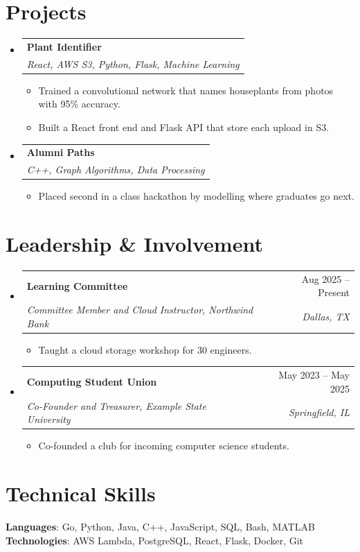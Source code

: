 \documentclass[letterpaper,11pt]{article}
\makeatletter
\newcommand{\entry}[4]{
  \item
  \begin{tabular*}{0.97\textwidth}[t]{l@{\extracolsep{\fill}}r}
    \textbf{#1} & #2 \\
    \textit{\small#3} & \textit{\small #4} \\
  \end{tabular*}\vspace{-7pt}
}
\newcommand{\project}[2]{
  \item
  \begin{tabular*}{0.97\textwidth}[t]{l}
    \textbf{#1} \\
    \textit{\small#2} \\
  \end{tabular*}\vspace{-7pt}
}
\newenvironment{entries}{\begin{itemize}[leftmargin=0.15in, label={}]}{\end{itemize}}
\newenvironment{points}{\begin{itemize}[leftmargin=0.2in]}{\end{itemize}\vspace{-5pt}}
\makeatother
\begin{document}
\section{Projects}
\begin{entries}
  \project{Plant Identifier}{React, AWS S3, Python, Flask, Machine Learning}
  \begin{points}
    \item Trained a convolutional network that names houseplants from photos with 95\% accuracy.
    \item Built a React front end and Flask API that store each upload in S3.
  \end{points}
  \project{Alumni Paths}{C++, Graph Algorithms, Data Processing}
  \begin{points}
    \item Placed second in a class hackathon by modelling where graduates go next.
  \end{points}
\end{entries}

\section{Leadership \& Involvement}
\begin{entries}
  \entry{Learning Committee}{Aug 2025 -- Present}{Committee Member and Cloud Instructor, Northwind Bank}{Dallas, TX}
  \begin{points}
    \item Taught a cloud storage workshop for 30 engineers.
  \end{points}
  \entry{Computing Student Union}{May 2023 -- May 2025}{Co-Founder and Treasurer, Example State University}{Springfield, IL}
  \begin{points}
    \item Co-founded a club for incoming computer science students.
  \end{points}
\end{entries}

\section{Technical Skills}
\textbf{Languages}: Go, Python, Java, C++, JavaScript, SQL, Bash, MATLAB \\
\textbf{Technologies}: AWS Lambda, PostgreSQL, React, Flask, Docker, Git
\end{document}
